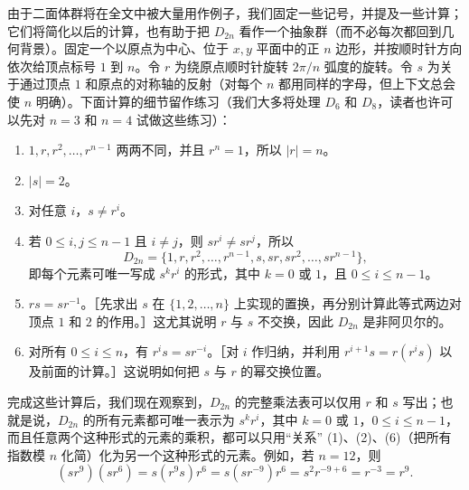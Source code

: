 \begin{center}
\end{center}

由于二面体群将在全文中被大量用作例子，我们固定一些记号，并提及一些计算；它们将简化以后的计算，也有助于把 $D_{2n}$ 看作一个抽象群（而不必每次都回到几何背景）。固定一个以原点为中心、位于 $x,y$ 平面中的正 $n$ 边形，并按顺时针方向依次给顶点标号 $1$ 到 $n$。令 $r$ 为绕原点顺时针旋转 $2\pi/n$ 弧度的旋转。令 $s$ 为关于通过顶点 $1$ 和原点的对称轴的反射（对每个 $n$ 都用同样的字母，但上下文总会使 $n$ 明确）。下面计算的细节留作练习（我们大多将处理 $D_6$ 和 $D_8$，读者也许可以先对 $n=3$ 和 $n=4$ 试做这些练习）：
\begin{enumerate}[label=(\arabic*)]
  \item $1,r,r^2,\ldots,r^{n-1}$ 两两不同，并且 $r^n=1$，所以 $|r|=n$。
  \item $|s|=2$。
  \item 对任意 $i$，$s\neq r^i$。
  \item 若 $0\leq i,j\leq n-1$ 且 $i\neq j$，则 $sr^i\neq sr^j$，所以
  \[
    D_{2n}=\{1,r,r^2,\ldots,r^{n-1},s,sr,sr^2,\ldots,sr^{n-1}\},
  \]
  即每个元素可唯一写成 $s^kr^i$ 的形式，其中 $k=0$ 或 $1$，且 $0\leq i\leq n-1$。
  \item $rs=sr^{-1}$。［先求出 $s$ 在 $\{1,2,\ldots,n\}$ 上实现的置换，再分别计算此等式两边对顶点 $1$ 和 $2$ 的作用。］这尤其说明 $r$ 与 $s$ 不交换，因此 $D_{2n}$ 是非阿贝尔的。
  \item 对所有 $0\leq i\leq n$，有 $r^is=sr^{-i}$。［对 $i$ 作归纳，并利用 $r^{i+1}s=r(r^is)$ 以及前面的计算。］这说明如何把 $s$ 与 $r$ 的幂交换位置。
\end{enumerate}

完成这些计算后，我们现在观察到，$D_{2n}$ 的完整乘法表可以仅用 $r$ 和 $s$ 写出；也就是说，$D_{2n}$ 的所有元素都可唯一表示为 $s^kr^i$，其中 $k=0$ 或 $1$，$0\leq i\leq n-1$，而且任意两个这种形式的元素的乘积，都可以只用“关系” (1)、(2)、(6)（把所有指数模 $n$ 化简）化为另一个这种形式的元素。例如，若 $n=12$，则
\[
  (sr^9)(sr^6)=s(r^9s)r^6=s(sr^{-9})r^6=s^2r^{-9+6}=r^{-3}=r^9.
\]

